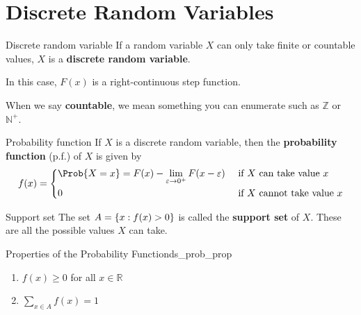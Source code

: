 \section{Discrete Random Variables}
\begin{Definition}{Discrete random variable}{}
    If a random variable $ X $ can only take
    finite or countable values, $ X $
    is a \textbf{discrete random variable}.
\end{Definition}
In this case, $ F(x) $ is a right-continuous
step function.
\begin{Remark}{}{}
    When we say \textbf{countable}, we mean
    something you can enumerate such as $ \mathbb{Z} $ or
    $ \mathbb{N}^+ $.
\end{Remark}

\begin{Definition}{Probability function}{}
    If $ X $ is a discrete random variable,
    then the \textbf{probability function} (p.f.) of $ X $ is given by
    \[ f(x)=
        \begin{dcases}
            \Prob{X=x}=
            F(x)-\lim\limits_{{\varepsilon} \to {0^+}}
            F(x-\varepsilon) & \text{ if } X\text{ can take value }x    \\
            0                & \text{ if } X\text{ cannot take value }x
        \end{dcases} \]
\end{Definition}

\begin{Definition}{Support set}{}
    The set $ A=\{x:f(x)>0\} $ is called the \textbf{support set}
    of $ X $. These are all the possible values $ X $ can take.
\end{Definition}

\begin{Proposition}{Properties of the Probability Function}{ds_prob_prop}
    \begin{enumerate}[label=(\arabic*)]
        \item $ f(x)\geqslant 0 $ for all $ x\in\mathbb{R} $
        \item $ \sum\limits_{x\in A}f(x)=1 $
    \end{enumerate}
\end{Proposition}

